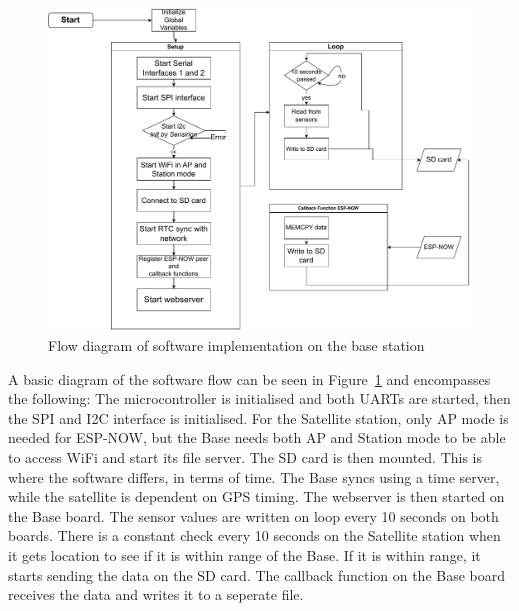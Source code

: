 \begin{figure}[!htb]
	\centering
	\includegraphics[width=\textwidth]{body/fig/flowchart.drawio.pdf}
	\caption{Flow diagram of software implementation on the base station}
	\label{fig:softwareoverview}
\end{figure}
\noindent
A basic diagram of the software flow can be seen in Figure~\ref{fig:softwareoverview} and encompasses the following:
The microcontroller is initialised and both UARTs are started, then the SPI and I2C interface is initialised. For the Satellite station, only AP mode is needed for ESP-NOW, but the Base needs both AP and Station mode to be able to access WiFi and start its file server. The SD card is then mounted. This is where the software differs, in terms of time. The Base syncs using a time server, while the satellite is dependent on GPS timing. The webserver is then started on the Base board. The sensor values are written on loop every 10 seconds on both boards. There is a constant check every 10 seconds on the Satellite station when it gets location to see if it is within range of the Base. If it is within range, it starts sending the data on the SD card. The callback function on the Base board receives the data and writes it to a seperate file.


